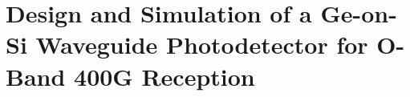 \chapter[Ge-on-Si Photodetector]{Design and Simulation of a Ge-on-Si Waveguide Photodetector for O-Band 400G Reception}
\label{chap:photodetector}











